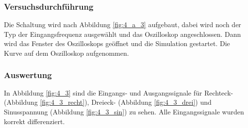 \documentclass[12pt,a4paper]{article}
\begin{document}
\subsubsection{Versuchsdurchführung}

Die Schaltung wird nach Abbildung \ref{fig:4_a_3} aufgebaut, dabei wird noch der Typ der Eingangsfrequenz ausgewählt und das Oszilloskop angeschlossen. Dann wird das Fenster des Oszilloskops geöffnet und die Simulation gestartet. Die Kurve auf dem Oszilloskop aufgenommen.

\subsubsection{Auswertung}

In Abbildung \ref{fig:4_3} sind die Eingangs- und Ausgangssignale für Rechteck- (Abbildung \ref{fig:4_3_recht}), Dreieck- (Abbildung \ref{fig:4_3_drei}) und Sinusspannung (Abbildung \ref{fig:4_3_sin}) zu sehen. Alle Eingangssignale wurden korrekt differenziert.
\end{document}
